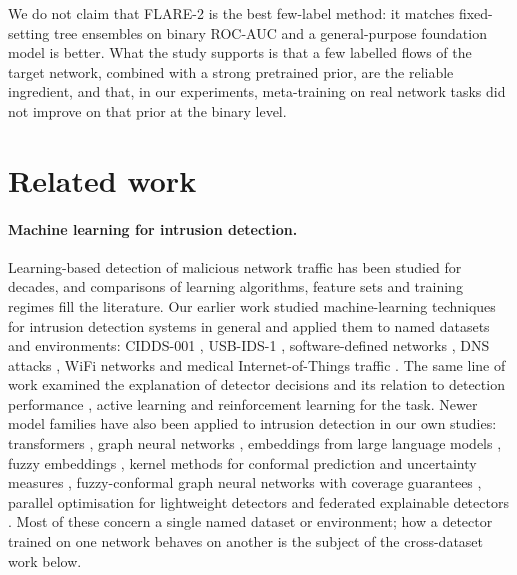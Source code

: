 \documentclass[pdflatex,sn-mathphys-num]{sn-jnl}%
\begin{document}
We do not claim that FLARE-2 is the best few-label method: it matches fixed-setting tree ensembles on binary ROC-AUC and a general-purpose foundation model is better.
What the study supports is that a few labelled flows of the target network, combined with a strong pretrained prior, are the reliable ingredient, and that, in our experiments, meta-training on real network tasks did not improve on that prior at the binary level.

\section{Related work}
\paragraph{Machine learning for intrusion detection.}
Learning-based detection of malicious network traffic has been studied for decades, and comparisons of learning algorithms, feature sets and training regimes fill the literature.
Our earlier work studied machine-learning techniques for intrusion detection systems in general \citep{dang2019studying,dang2022cai,dang2022mlids} and applied them to named datasets and environments: CIDDS-001 \citep{dang2021cidds,dang2022cidds}, USB-IDS-1 \citep{dang2023usbmulti}, software-defined networks \citep{dang2021sdn,dang2024fuzzy}, DNS attacks \citep{dang2022dns,dang2021fuzzydns}, WiFi networks \citep{dang2023wifi} and medical Internet-of-Things traffic \citep{dang2024iomt}.
The same line of work examined the explanation of detector decisions and its relation to detection performance \citep{dang2020understand,dang2021explain}, active learning \citep{dang2020active} and reinforcement learning \citep{dang2022rl} for the task.
Newer model families have also been applied to intrusion detection in our own studies: transformers \citep{dang2023transformer}, graph neural networks \citep{dang2023wifi}, embeddings from large language models \citep{dang2025llm}, fuzzy embeddings \citep{dang2024fuzzy}, kernel methods for conformal prediction and uncertainty measures \citep{dang2024conformal,dang2026uncertainty}, fuzzy-conformal graph neural networks with coverage guarantees \citep{dang2026fcgnn}, parallel optimisation for lightweight detectors \citep{dang2024lightweight} and federated explainable detectors \citep{dang2026stfedxids}.
Most of these concern a single named dataset or environment; how a detector trained on one network behaves on another is the subject of the cross-dataset work below.
\end{document}

